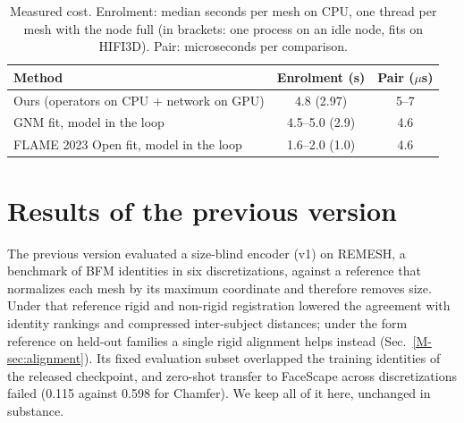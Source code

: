 \documentclass[10pt,twocolumn,letterpaper]{article}
\begin{document}
\begin{table}[h]
  \centering
  \scriptsize
  \caption{Measured cost. Enrolment: median seconds per mesh on CPU, one thread per mesh with the node full (in brackets: one process on an idle node, fits on HIFI3D). Pair: microseconds per comparison.}
  \label{tab:cost}
  \begin{tabular}{lcc}
    \toprule
    Method & Enrolment (s) & Pair ($\mu$s) \\
    \midrule
    Ours (operators on CPU + network on GPU) & 4.8 (2.97) & 5--7 \\
    GNM fit, model in the loop & 4.5--5.0 (2.9) & 4.6 \\
    FLAME 2023 Open fit, model in the loop & 1.6--2.0 (1.0) & 4.6 \\
    \bottomrule
  \end{tabular}
\end{table}

\FloatBarrier
\section{Results of the previous version}
\label{sec:legacy}
The previous version evaluated a size-blind encoder (v1) on REMESH, a benchmark of BFM identities in six discretizations, against a reference that normalizes each mesh by its maximum coordinate and therefore removes size. Under that reference rigid and non-rigid registration lowered the agreement with identity rankings and compressed inter-subject distances; under the form reference on held-out families a single rigid alignment helps instead (Sec.~\ref{M-sec:alignment}). Its fixed evaluation subset overlapped the training identities of the released checkpoint, and zero-shot transfer to FaceScape across discretizations failed (0.115 against 0.598 for Chamfer). We keep all of it here, unchanged in substance.



{\small


}
\end{document}
